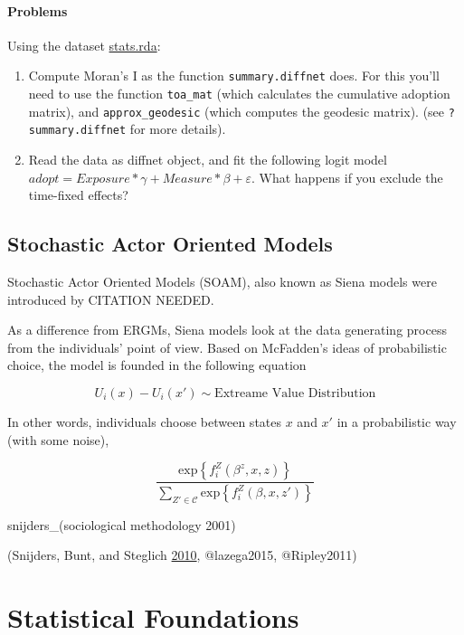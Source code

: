 \documentclass[]{book}
\begin{document}
\hypertarget{problems-2}{%
\subsection{Problems}\label{problems-2}}

Using the dataset \url{stats.rda}:

\begin{enumerate}
\def\labelenumi{\arabic{enumi}.}
\item
  Compute Moran's I as the function \texttt{summary.diffnet} does. For this you'll need
  to use the function \texttt{toa\_mat} (which calculates the cumulative adoption matrix),
  and \texttt{approx\_geodesic} (which computes the geodesic matrix). (see \texttt{?summary.diffnet}
  for more details).
\item
  Read the data as diffnet object, and fit the following logit model \(adopt = Exposure*\gamma + Measure*\beta + \varepsilon\).
  What happens if you exclude the time-fixed effects?
\end{enumerate}

\hypertarget{stochastic-actor-oriented-models}{%
\chapter{Stochastic Actor Oriented Models}\label{stochastic-actor-oriented-models}}

Stochastic Actor Oriented Models (SOAM), also known as Siena models were introduced by CITATION NEEDED.

As a difference from ERGMs, Siena models look at the data generating process from the individuals' point of view. Based on McFadden's ideas of probabilistic choice, the model is founded in the following equation

\[
U_i(x) - U_i(x') \sim \mbox{Extreame Value Distribution}
\]

In other words, individuals choose between states \(x\) and \(x'\) in a probabilistic way (with some noise),

\[
\frac{\mbox{exp}\left\{f_i^Z(\beta^z,x, z)\right\}}{\sum_{Z'\in\mathcal{C}}\mbox{exp}\left\{f_i^{Z}(\beta, x, z')\right\}}
\]

snijders\_(sociological methodology 2001)

(Snijders, Bunt, and Steglich \protect\hyperlink{ref-Snijders2010}{2010}, @lazega2015, @Ripley2011)

\hypertarget{part-statistical-foundations}{%
\part{Statistical Foundations}\label{part-statistical-foundations}}
\end{document}
